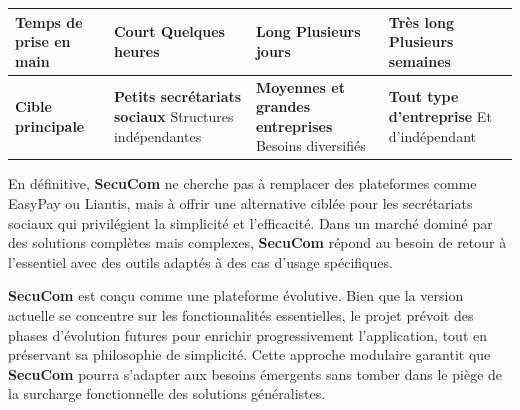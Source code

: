 \begin{table}[H]
{\begin{tabular}{p{3.2cm}p{4.2cm}p{4.2cm}p{4.2cm}}
\textbf{Temps de prise en main} & 
\textcolor{green!70!black}{\small\textbf{Court}} \newline
\small{Quelques heures} & 
\textcolor{orange!70!black}{\small\textbf{Long}} \newline
\small{Plusieurs jours} & 
\textcolor{red!70!black}{\small\textbf{Très long}} \newline
\small{Plusieurs semaines} \\
\midrule

\textbf{Cible principale} & 
\textbf{Petits secrétariats sociaux} \newline
\small{Structures indépendantes} & 
\textbf{Moyennes et grandes entreprises} \newline
\small{Besoins diversifiés} & 
\textbf{Tout type d'entreprise} \newline
\small{Et d'indépendant} \\
\bottomrule
\end{tabular}%
}
\end{table}

\noindent En définitive, \textbf{SecuCom} ne cherche pas à remplacer des plateformes comme EasyPay ou Liantis, mais à offrir une alternative ciblée pour les secrétariats sociaux qui privilégient la simplicité et l'efficacité. Dans un marché dominé par des solutions complètes mais complexes, \textbf{SecuCom} répond au besoin de retour à l'essentiel avec des outils adaptés à des cas d'usage spécifiques.

\vspace{0.5cm}

\begin{tcolorbox}[
  title={\textbf{Évolutivité de SecuCom}},
  colback=blue!5!white,
  colframe=primarycolor,
  fonttitle=\bfseries,
  boxrule=0.5mm,
  arc=2mm,
  left=6mm,
  right=6mm,
  top=6mm,
  bottom=6mm
]
\noindent \textbf{SecuCom} est conçu comme une plateforme évolutive. Bien que la version actuelle se concentre sur les fonctionnalités essentielles, le projet prévoit des phases d'évolution futures pour enrichir progressivement l'application, tout en préservant sa philosophie de simplicité. Cette approche modulaire garantit que \textbf{SecuCom} pourra s'adapter aux besoins émergents sans tomber dans le piège de la surcharge fonctionnelle des solutions généralistes.
\end{tcolorbox}
